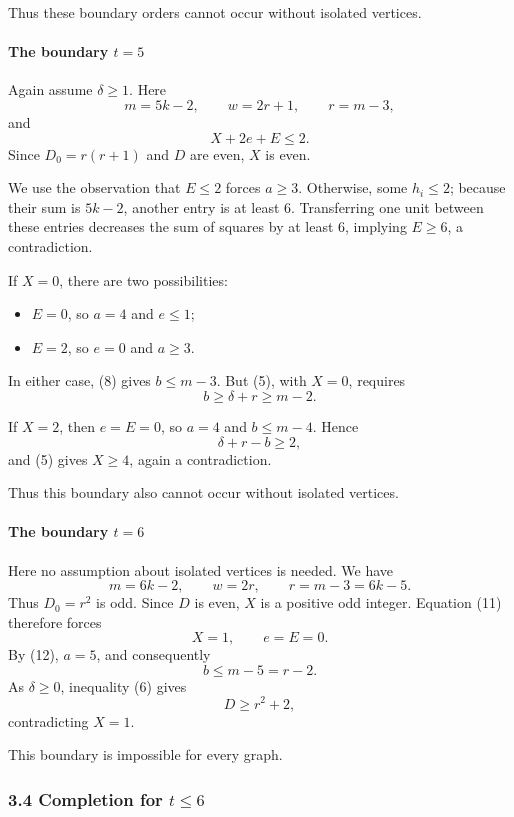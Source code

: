 \documentclass[
  11pt,
  a4paper,
]{article}
\providecommand{\tightlist}{%
  \setlength{\itemsep}{0pt}\setlength{\parskip}{0pt}}
\begin{document}
Thus these boundary orders cannot occur without isolated vertices.

\paragraph{\texorpdfstring{The boundary
\(t=5\)}{The boundary t=5}}\label{the-boundary-t5}

Again assume \(\delta\ge1\). Here \[
m=5k-2,\qquad w=2r+1,\qquad r=m-3,
\] and \[
X+2e+E\le2.
\] Since \(D_0=r(r+1)\) and \(D\) are even, \(X\) is even.

We use the observation that \(E\le2\) forces \(a\ge3\). Otherwise, some
\(h_i\le2\); because their sum is \(5k-2\), another entry is at least
\(6\). Transferring one unit between these entries decreases the sum of
squares by at least \(6\), implying \(E\ge6\), a contradiction.

If \(X=0\), there are two possibilities:

\begin{itemize}
\tightlist
\item
  \(E=0\), so \(a=4\) and \(e\le1\);
\item
  \(E=2\), so \(e=0\) and \(a\ge3\).
\end{itemize}

In either case, (8) gives \(b\le m-3\). But (5), with \(X=0\), requires
\[
b\ge\delta+r\ge m-2.
\]

If \(X=2\), then \(e=E=0\), so \(a=4\) and \(b\le m-4\). Hence \[
\delta+r-b\ge2,
\] and (5) gives \(X\ge4\), again a contradiction.

Thus this boundary also cannot occur without isolated vertices.

\paragraph{\texorpdfstring{The boundary
\(t=6\)}{The boundary t=6}}\label{the-boundary-t6}

Here no assumption about isolated vertices is needed. We have \[
m=6k-2,\qquad w=2r,\qquad r=m-3=6k-5.
\] Thus \(D_0=r^2\) is odd. Since \(D\) is even, \(X\) is a positive odd
integer. Equation (11) therefore forces \[
X=1,\qquad e=E=0.
\] By (12), \(a=5\), and consequently \[
b\le m-5=r-2.
\] As \(\delta\ge0\), inequality (6) gives \[
D\ge r^2+2,
\] contradicting \(X=1\).

This boundary is impossible for every graph.

\subsubsection{\texorpdfstring{3.4 Completion for
\(t\le6\)}{3.4 Completion for t\textbackslash le6}}\label{completion-for-tle6}
\end{document}
